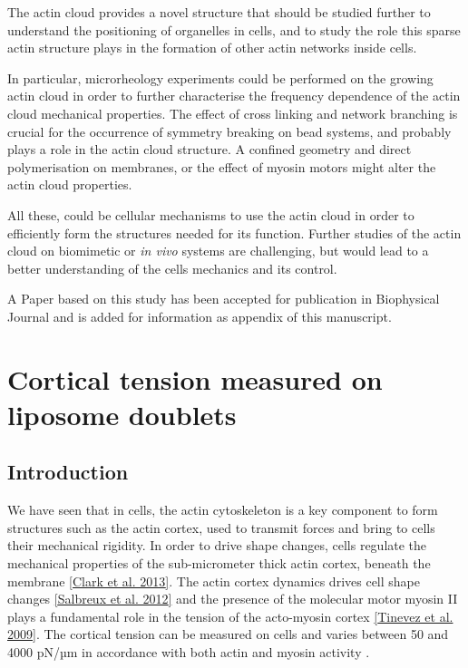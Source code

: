 \documentclass[A4paperpaper,11pt,english]{sphinxmanual}
\begin{document}
The actin cloud provides a novel structure that should be studied further to
understand the positioning of organelles in cells, and to study the role this sparse
actin structure plays in the formation of other actin networks inside cells.

In particular, microrheology experiments could be performed on the growing actin
cloud in order to further characterise the frequency dependence of the actin cloud mechanical
properties. The effect of cross linking and network
branching is crucial for the occurrence of symmetry breaking on bead systems, and
probably plays a role in the actin cloud structure. A confined
geometry and direct polymerisation on membranes, or the effect of myosin motors
might alter the actin cloud properties.

All these, could be cellular mechanisms to use the actin cloud in order
to efficiently form the structures needed for its function.
Further studies of the actin cloud on biomimetic or \emph{in vivo} systems are
challenging, but would lead to a better understanding of the cells mechanics
and its control.

A Paper based on this study has been accepted for publication in Biophysical
Journal and is added for information as appendix of this manuscript.


\chapter{Cortical tension measured on liposome doublets}
\label{index-latex:cortical-tension-measured-on-liposome-doublets}\label{index-latex::doc}\label{index-latex:lib-doub}

\section{Introduction}
\label{index-latex:introduction}
We have seen that in cells, the actin cytoskeleton is a key component to form
structures such as the actin cortex, used to transmit forces and bring to cells
their mechanical rigidity. In order to drive shape changes, cells regulate the
mechanical properties of the sub-micrometer thick actin cortex,
beneath the membrane {\hyperref[index-latex:clark2013]{{[}Clark et al. 2013{]}}}. The actin cortex dynamics
drives cell shape changes {\hyperref[index-latex:salbreux2012b]{{[}Salbreux et al. 2012{]}}} and the presence of the
molecular motor myosin II plays a fundamental role in the tension of the
acto-myosin cortex {\hyperref[index-latex:tinevez2009]{{[}Tinevez et al. 2009{]}}}. The cortical tension can be measured on
cells and varies between 50 and 4000 pN/µm in accordance with both actin and myosin activity .
\end{document}
